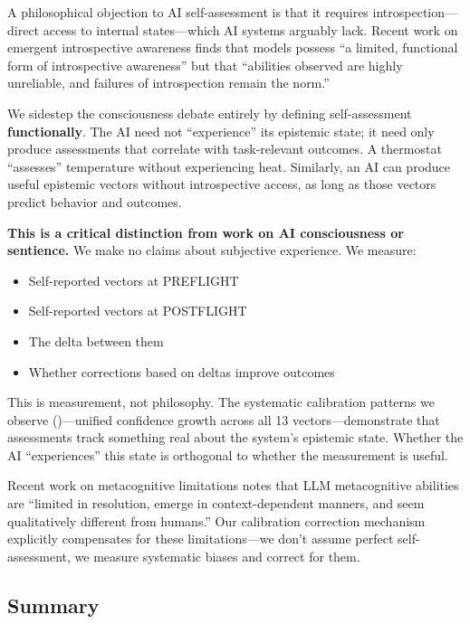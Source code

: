 A philosophical objection to AI self-assessment is that it requires introspection---direct access to internal states---which AI systems arguably lack. Recent work on emergent introspective awareness \citep{bricken2025introspection} finds that models possess ``a limited, functional form of introspective awareness'' but that ``abilities observed are highly unreliable, and failures of introspection remain the norm.''

We sidestep the consciousness debate entirely by defining self-assessment \textbf{functionally}. The AI need not ``experience'' its epistemic state; it need only produce assessments that correlate with task-relevant outcomes. A thermostat ``assesses'' temperature without experiencing heat. Similarly, an AI can produce useful epistemic vectors without introspective access, as long as those vectors predict behavior and outcomes.

\textbf{This is a critical distinction from work on AI consciousness or sentience.} We make no claims about subjective experience. We measure:
\begin{itemize}
    \item Self-reported vectors at PREFLIGHT
    \item Self-reported vectors at POSTFLIGHT
    \item The delta between them
    \item Whether corrections based on deltas improve outcomes
\end{itemize}

This is measurement, not philosophy. The systematic calibration patterns we observe ()---unified confidence growth across all 13 vectors---demonstrate that assessments track something real about the system's epistemic state. Whether the AI ``experiences'' this state is orthogonal to whether the measurement is useful.

Recent work on metacognitive limitations \citep{steyvers2025metacognition} notes that LLM metacognitive abilities are ``limited in resolution, emerge in context-dependent manners, and seem qualitatively different from humans.'' Our calibration correction mechanism explicitly compensates for these limitations---we don't assume perfect self-assessment, we measure systematic biases and correct for them.

\subsection{Summary}

